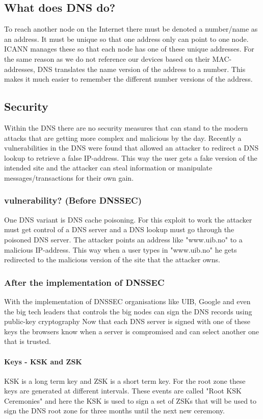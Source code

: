 \documentclass{article}
\begin{document}
		\subsection{What does DNS do?}
		To reach another node on the Internet there must be denoted a number/name as an address. It must be unique so that one address only can point to one node.\\
		ICANN manages these so that each node has one of these unique addresses. For the same reason as we do not reference our devices based on their MAC-addresses, DNS translates the name version of the address to a number. This makes it much easier to remember the different number versions of the address.
		
		\subsection{Security}
		Within the DNS there are no security measures that can stand to the modern attacks that are getting more complex and malicious by the day. Recently a vulnerabilities in the DNS were found that allowed an attacker to redirect a DNS lookup to retrieve a false IP-address. This way the user gets a fake version of the intended site and the attacker can steal information or manipulate messages/transactions for their own gain.
            \subsubsection{vulnerability? (Before DNSSEC)}
            One DNS variant is DNS cache poisoning. For this exploit to work the attacker must get control of a DNS server and a DNS lookup must go through the poisoned DNS server. The attacker points an address like "www.uib.no" to a malicious IP-address. This way when a user types in "www.uib.no" he gets redirected to the malicious version of the site that the attacker owns.
            \subsubsection{After the implementation of DNSSEC}
            With the implementation of DNSSEC organisations like UIB, Google and even the big tech leaders that controls the big nodes can sign the DNS records using public-key cryptography\cite{icann}
            Now that each DNS server is signed with one of these keys the browsers know when a server is compromised and can select another one that is trusted.
            \paragraph{Keys - KSK and ZSK}
            KSK is a long term key and ZSK is a short term key. For the root zone these keys are generated at different intervals. These events are called "Root KSK Ceremonies" and here the KSK is used to sign a set of ZSKs that will be used to sign the DNS root zone for three months until the next new ceremony. \cite{iana}
            
\end{document}
